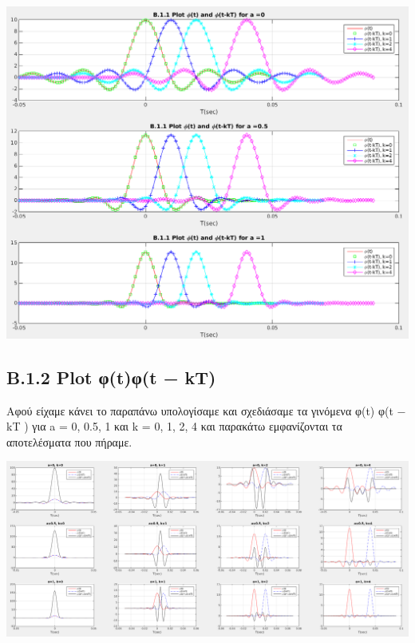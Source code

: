 \documentclass[11pt]{article}
\begin{document}
    \begin{center}
        \includegraphics[scale=0.4]{photos/B.1.1 Plot phi_t and phi_t_kT_screenshot.png}
    \end{center} 
    
    \subsection*{B.1.2 Plot φ(t)φ(t − kT)}
    Αφού είχαμε κάνει το παραπάνω υπολογίσαμε και σχεδιάσαμε τα γινόμενα φ(t) φ(t − kT ) για a = 0, 0.5, 1 και k = 0, 1, 2, 4 και παρακάτω εμφανίζονται τα αποτελέσματα που πήραμε.
    
    \begin{center}
        \includegraphics[scale=0.22]{photos/B.1.2 Products_screenshot_with_black.png}
    \end{center} 
    
\end{document}
